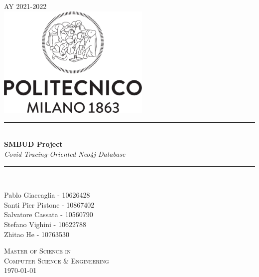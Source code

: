 \documentclass{article}[IEEEtran]
\newcommand{\HRule}{\rule{\linewidth}{0.5mm}}
\begin{document}
\begin{titlepage}
\begin{center}

\captionsetup{font=footnotesize}

\textsc{AY 2021-2022}\\[2cm]

\includegraphics[width=0.55\textwidth]{logo.png}~\\[2cm]


\HRule \\[0.4cm]
{ \LARGE 
  \textbf{SMBUD Project}\\[0.4cm]
  \emph{Covid Tracing-Oriented Neo4j Database}\\[0.4cm]
}
\HRule \\[1.5cm]



\begin{center}
    {\large Pablo Giaccaglia - 10626428\\[0.1cm]  Santi Pier Pistone - 10867402 \\[0.1cm]    Salvatore Cassata - 10560790\\[0.1cm]  Stefano Vighini - 10622788\\[0.1cm]  Zhitao He - 10763530\\[0.1cm] 
}
\end{center}

\vfill

\textsc{\large Master of Science in \\Computer Science \& Engineering}\\[0.4cm]


{\large \today}
 
\end{center}
\end{titlepage}

\newpage


\tableofcontents
{}
\newpage
\setcounter{page}{1}
\end{document}
